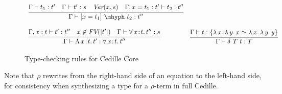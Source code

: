 \documentclass{article}
\newcommand{\abs}[4]{{#1}\, #2\! : \! #3.\, #4}
\newcommand{\absu}[3]{{#1}\, #2.\, #3}
\begin{document}
\begin{figure}
{\[\begin{array}{lll}
    \multicolumn{2}{l}{
    \infer{\Gamma\vdash [ x = t_1 ]\ \mhyph\ t_2 : t''}{\Gamma\vdash t_1 : t' \quad \Gamma \vdash t' : s \quad \textit{Var}(x,s) \quad
      \Gamma, x = t_1 : t' \vdash t_2 : t''} } &
   \ 
    \\ \\
    \multicolumn{2}{l}{
      \infer{\Gamma\vdash\abs{\Lambda}{x}{t}{t'} : \abs{\forall}{x}{t}{t''}}{\Gamma,x:t\vdash t':t'' \quad x\not\in\textit{FV}(|t'|)\quad \Gamma \vdash \abs{\forall}{x}{t}{t''} : s}}&
    \infer{\Gamma\vdash \delta\ T\ t : T}{\Gamma\vdash t : \{ \absu{\lambda}{x}{\absu{\lambda}{y}{x}} \simeq \absu{\lambda}{x}{\absu{\lambda}{y}{y}}\} } 

  \end{array}
  \]
}
  \caption{Type-checking rules for Cedille Core}
  \label{fig:rules}
\end{figure}

Note that $\rho$ rewrites from the right-hand side of an equation to
the left-hand side, for consistency when synthesizing a type for a
$\rho$-term in full Cedille.
\end{document}
